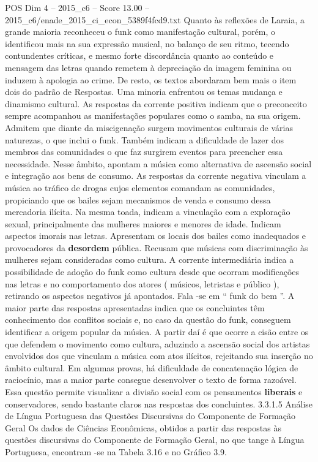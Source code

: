 \begin{textsample}{POS Dim 4 – 2015\_c6 – Score 13.00 – 2015\_c6/enade\_2015\_ci\_econ\_5389f4fcd9.txt}
Quanto às reflexões de Laraia, a grande maioria reconheceu o funk como manifestação cultural, porém, o identificou mais na sua expressão musical, no balanço de seu ritmo, tecendo contundentes críticas, e mesmo forte discordância quanto ao conteúdo e mensagem das letras quando remetem à depreciação da imagem feminina ou induzem à apologia ao crime.
De resto, os textos abordaram bem mais o item dois do padrão de Respostas.
Uma minoria enfrentou os temas mudança e dinamismo cultural.
As respostas da corrente positiva indicam que o preconceito sempre acompanhou as manifestações populares como o samba, na sua origem.
Admitem que diante da miscigenação surgem movimentos culturais de várias naturezas, o que inclui o funk.
Também indicam a dificuldade de lazer dos membros das comunidades o que faz surgirem eventos para preencher essa necessidade.
Nesse âmbito, apontam a música como alternativa de ascensão social e integração aos bens de consumo.
As respostas da corrente negativa vinculam a música ao tráfico de drogas cujos elementos comandam as comunidades, propiciando que os bailes sejam mecanismos de venda e consumo dessa mercadoria ilícita.
Na mesma toada, indicam a vinculação com a exploração sexual, principalmente das mulheres maiores e menores de idade.
Indicam aspectos imorais nas letras.
Apresentam os locais dos bailes como inadequados e provocadores da \textbf{desordem} pública.
Recusam que músicas com discriminação às mulheres sejam consideradas como cultura.
A corrente intermediária indica a possibilidade de adoção do funk como cultura desde que ocorram modificações nas letras e no comportamento dos atores ( músicos, letristas e público ), retirando os aspectos negativos já apontados.
Fala -se em “ funk do bem ”.
A maior parte das respostas apresentadas indica que os concluintes têm conhecimento dos conflitos sociais e, no caso da questão do funk, conseguem identificar a origem popular da música.
A partir daí é que ocorre a cisão entre os que defendem o movimento como cultura, aduzindo a ascensão social dos artistas envolvidos dos que vinculam a música com atos ilícitos, rejeitando sua inserção no âmbito cultural.
Em algumas provas, há dificuldade de concatenação lógica de raciocínio, mas a maior parte consegue desenvolver o texto de forma razoável.
Essa questão permite visualizar a divisão social com os pensamentos \textbf{liberais} e conservadores, sendo bastante claros nas respostas dos concluintes. 3.3.1.5 Análise de Língua Portuguesa das Questões Discursivas do Componente de Formação Geral Os dados de Ciências Econômicas, obtidos a partir das respostas às questões discursivas do Componente de Formação Geral, no que tange à Língua Portuguesa, encontram -se na Tabela 3.16 e no Gráfico 3.9.

\end{textsample}
